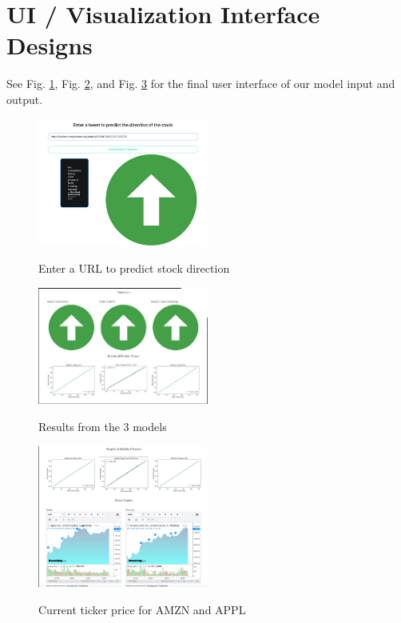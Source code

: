 \documentclass[conference]{IEEEtran}
\begin{document}
\section{UI / Visualization Interface Designs}
See Fig. \ref{fig1}, Fig. \ref{fig2}, and Fig. \ref{fig3} for the final user interface of our model input and output.
\begin{figure}[h!]
  \caption{Enter a URL to predict stock direction}
  \includegraphics[width=0.5\textwidth]{2.png}
  \label{fig1}
\end{figure}
\begin{figure}[h!]
  \caption{Results from the 3 models}
  \includegraphics[width=0.5\textwidth]{1.png}
  \label{fig2}
\end{figure}
\begin{figure}[h!]
  \caption{Current ticker price for AMZN and APPL}
  \includegraphics[width=0.5\textwidth]{3.png}
  \label{fig3}
\end{figure}
\end{document}
